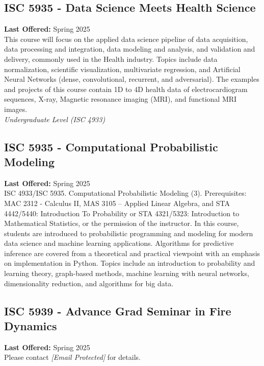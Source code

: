 \documentclass[12pt,a4paper]{article}
\begin{document}
\subsection{ISC 5935 - Data Science Meets Health Science}
\textbf{Last Offered:} Spring 2025 \\
This course will focus on the applied data science pipeline of data acquisition, data processing and integration, data modeling and analysis, and validation and delivery, commonly used in the Health industry. Topics include data normalization, scientific visualization, multivariate regression, and Artificial Neural Networks (dense, convolutional, recurrent, and adversarial). The examples and projects of this course contain 1D to 4D health data of electrocardiogram sequences, X-ray, Magnetic resonance imaging (MRI), and functional MRI images. \\
\textit{Undergraduate Level (ISC 4933)}

\subsection{ISC 5935 - Computational Probabilistic Modeling}
\textbf{Last Offered:} Spring 2025 \\
ISC 4933/ISC 5935. Computational Probabilistic Modeling (3). Prerequisites: MAC 2312 - Calculus II, MAS 3105 – Applied Linear Algebra, and STA 4442/5440: Introduction To Probability or STA 4321/5323: Introduction to Mathematical Statistics, or the permission of the instructor. In this course, students are introduced to probabilistic programming and modeling for modern data science and machine learning applications. Algorithms for predictive inference are covered from a theoretical and practical viewpoint with an emphasis on implementation in Python. Topics include an introduction to probability and learning theory, graph-based methods, machine learning with neural networks, dimensionality reduction, and algorithms for big data.

\subsection{ISC 5939 - Advance Grad Seminar in Fire Dynamics}
\textbf{Last Offered:} Spring 2025 \\
Please contact \textit{[Email Protected]} for details.
\end{document}
